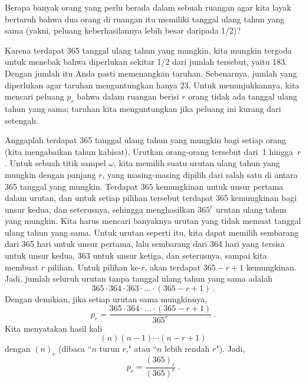 \begin{example}\label{exam 3.3} Berapa banyak orang yang perlu berada dalam sebuah
ruangan agar kita layak bertaruh bahwa dua orang di ruangan itu memiliki tanggal ulang
tahun yang sama (yakni, peluang keberhasilannya lebih besar daripada 1/2)?

Karena terdapat 365 tanggal ulang tahun yang mungkin, kita mungkin tergoda untuk
menebak bahwa diperlukan sekitar 1/2 dari jumlah tersebut, yaitu 183.  Dengan jumlah
itu Anda pasti memenangkan taruhan.  Sebenarnya, jumlah yang diperlukan agar taruhan
menguntungkan hanya 23.  Untuk menunjukkannya, kita mencari peluang $p_r$ bahwa dalam
ruangan berisi $r$ orang tidak ada tanggal ulang tahun yang sama; taruhan kita
menguntungkan jika peluang ini kurang dari setengah.

Anggaplah terdapat 365 tanggal ulang tahun yang mungkin bagi setiap orang (kita
mengabaikan tahun kabisat).  Urutkan orang-orang tersebut dari~1 hingga~$r$.  Untuk
sebuah titik sampel $\omega$, kita memilih suatu urutan ulang tahun yang mungkin dengan
panjang $r$, yang masing-masing dipilih dari salah satu di antara 365 tanggal yang
mungkin.  Terdapat 365 kemungkinan untuk unsur pertama dalam urutan, dan untuk setiap
pilihan tersebut terdapat 365 kemungkinan bagi unsur kedua, dan seterusnya, sehingga
menghasilkan $365^r$ urutan ulang tahun yang mungkin.  Kita harus mencari banyaknya
urutan yang tidak memuat tanggal ulang tahun yang sama.  Untuk urutan seperti itu, kita
dapat memilih sembarang dari 365 hari untuk unsur pertama, lalu sembarang dari 364 hari
yang tersisa untuk unsur kedua, 363 untuk unsur ketiga, dan seterusnya, sampai kita
membuat $r$ pilihan.  Untuk pilihan ke-$r$, akan terdapat $365 - r + 1$ kemungkinan.
Jadi, jumlah seluruh urutan tanpa tanggal ulang tahun yang sama adalah
$$ 365 \cdot 364 \cdot 363 \cdot \dots \cdot (365 - r + 1)\ .
$$ Dengan demikian, jika setiap urutan sama mungkinnya,
$$ p_r = \frac{365 \cdot 364 \cdot \dots \cdot (365 - r + 1)}{365^r}\ .
$$ Kita menyatakan hasil kali
$$(n)(n-1)\cdots (n - r +1)$$ dengan $(n)_r$ (dibaca ``$n$ turun $r$," atau ``$n$
lebih rendah $r$").  Jadi,
$$ p_r = \frac{(365)_r}{(365)^r}\ .
$$


\end{example}
